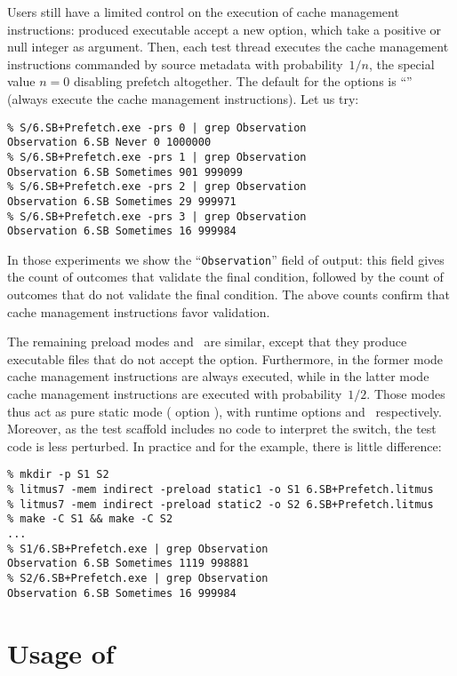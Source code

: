 Users still have a limited control on the
execution of cache management instructions: produced executable accept
a new  option, which take a positive or null integer as argument.
Then, each test thread executes the cache
management instructions commanded by source metadata with probability~$1/n$,
the special value $n=0$ disabling prefetch altogether.
The default for the  options is ``'' (always execute
the cache management instructions).
Let us try:
\begin{verbatim}
% S/6.SB+Prefetch.exe -prs 0 | grep Observation
Observation 6.SB Never 0 1000000
% S/6.SB+Prefetch.exe -prs 1 | grep Observation
Observation 6.SB Sometimes 901 999099
% S/6.SB+Prefetch.exe -prs 2 | grep Observation
Observation 6.SB Sometimes 29 999971
% S/6.SB+Prefetch.exe -prs 3 | grep Observation
Observation 6.SB Sometimes 16 999984
\end{verbatim}
In those experiments we show the ``\verb+Observation+'' field of \litmus{}
output: this field gives the count of outcomes that validate the final
condition, followed by the count of outcomes that do not validate
the final condition. The above counts confirm that
cache management instructions favor validation.

The remaining preload modes  and~ are similar,
except that they produce executable files that do not accept
the  option. Furthermore, in the former
mode  cache management instructions are always executed,
while in the latter mode 
cache management instructions are  executed with probability~$1/2$.
Those modes thus act as pure static mode
(\litmus{} option ),
with runtime options  and~ respectively.
Moreover,
as the test scaffold includes no code to interpret the 
switch, the test code is less perturbed.
In practice and for the  example, there is little difference:
\begin{verbatim}
% mkdir -p S1 S2
% litmus7 -mem indirect -preload static1 -o S1 6.SB+Prefetch.litmus
% litmus7 -mem indirect -preload static2 -o S2 6.SB+Prefetch.litmus
% make -C S1 && make -C S2
...
% S1/6.SB+Prefetch.exe | grep Observation
Observation 6.SB Sometimes 1119 998881
% S2/6.SB+Prefetch.exe | grep Observation
Observation 6.SB Sometimes 16 999984
\end{verbatim}

\section{Usage of \litmus{}}


